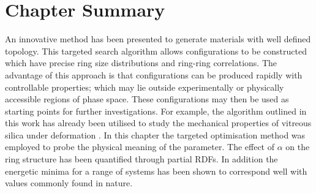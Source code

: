\section{Chapter Summary}

An innovative method has been presented to generate \td{} materials with well defined topology. 
This targeted \mc{} search algorithm allows configurations to be constructed which have precise ring size distributions and ring\--ring correlations.
The advantage of this approach is that configurations can be produced rapidly with controllable properties; which may lie outside experimentally or physically accessible regions of phase space.
These configurations may then be used as starting points for further investigations.
For example, the algorithm outlined in this work has already been utilised to study the mechanical properties of vitreous silica under deformation \cite{Bamer2020,Ebrahem2020a}.
In this chapter the targeted optimisation method was employed to probe the physical meaning of the \aw{} parameter.
The effect of $\alpha$ on the ring structure has been quantified through partial RDFs.
In addition the energetic minima for a range of systems has been shown to correspond well with values commonly found in nature.

 





